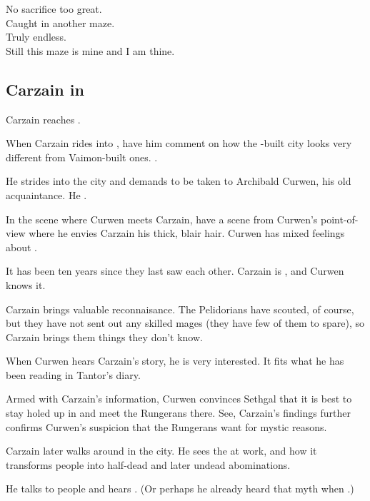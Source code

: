 \begin{garbage}
{  No sacrifice too great.\\
  Caught in another maze.\\
  Truly endless.\\
  Still this maze is mine and I am thine.
}









\subsection{Carzain in \Forklin}
Carzain reaches \Forklin. 

When Carzain rides into \Forklin, have him comment on how the \Ortaican-built city looks very different from Vaimon-built ones. 
. 

He strides into the city and demands to be taken to Archibald Curwen, his old acquaintance. 
He . 

In the scene where Curwen meets Carzain, have a scene from Curwen's point-of-view where he envies Carzain his thick, blair hair. 
Curwen has mixed feelings about . 

It has been ten years since they last saw each other. 
Carzain is , and Curwen knows it. 

Carzain brings valuable reconnaisance. 
The Pelidorians have scouted, of course, but they have not sent out any skilled mages (they have few of them to spare), so Carzain brings them things they don't know. 

When Curwen hears Carzain's story, he is very interested. 
It fits what he has been reading in Tantor's diary. 

Armed with Carzain's information, Curwen convinces Sethgal that it is best to stay holed up in \Forklin{} and meet the Rungerans there. 
See, Carzain's findings further confirms Curwen's suspicion that the Rungerans want \Forklin{} for mystic reasons. 

Carzain later walks around in the city. He sees the \hs{\Morbus} at work, and how it transforms people into half-dead and later undead abominations. 

He talks to people and hears . 
(Or perhaps he already heard that myth when .)


\end{garbage}
